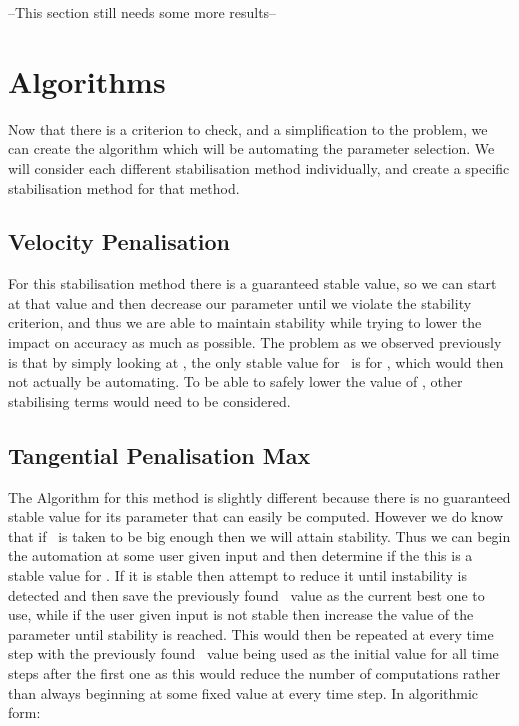 
--This section still needs some more results--

\section{Algorithms}

Now that there is a criterion to check, and a simplification to the problem, we can create the algorithm which will be automating the parameter selection. We will consider each different stabilisation method individually, and create a specific stabilisation method for that method.

\subsection{Velocity Penalisation}

For this stabilisation method there is a guaranteed stable value, so we can start at that value and then decrease our parameter until we violate the stability criterion, and thus we are able to maintain stability while trying to lower the impact on accuracy as much as possible. The problem as we observed previously is that by simply looking at , the only stable value for \mbeta~is for , which would then not actually be automating. To be able to safely lower the value of \mbeta, other stabilising terms would need to be considered.

\subsection{Tangential Penalisation Max}

The Algorithm for this method is slightly different because there is no guaranteed stable value for its parameter that can easily be computed. However we do know that if \mgamma~is taken to be big enough then we will attain stability. Thus we can begin the automation at some user given input and then determine if the this is a stable value for \mgamma. If it is stable then attempt to reduce it until instability is detected and then save the previously found \mgamma~value as the current best one to use, while if the user given input is not stable then increase the value of the parameter until stability is reached. This would then be repeated at every time step with the previously found \mgamma~value being used as the initial value for all time steps after the first one as this would reduce the number of computations rather than always beginning at some fixed value at every time step. In algorithmic form:

